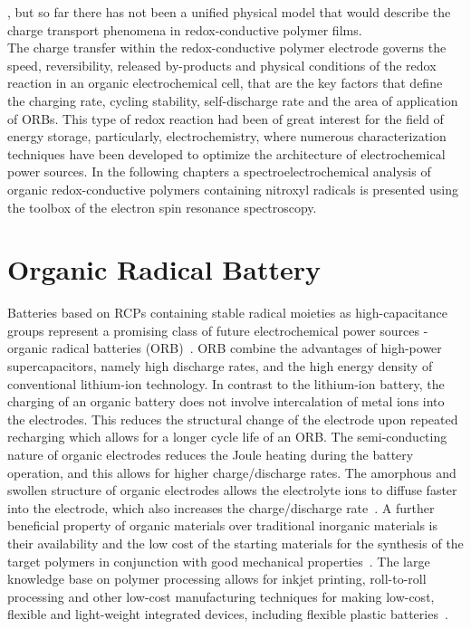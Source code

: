  , but so far there has not been a unified physical model that would describe the charge transport phenomena in redox-conductive polymer films.\\

The charge transfer within the redox-conductive polymer electrode governs the speed, reversibility, released by-products and physical conditions of the redox reaction in an organic electrochemical cell, that are the key factors that define the charging rate, cycling stability, self-discharge rate and the area of application of ORBs. This type of redox reaction had been of great interest for the field of energy storage, particularly, electrochemistry, where numerous characterization techniques have been developed to optimize the architecture of electrochemical power sources. In the following chapters a spectroelectrochemical analysis of organic redox-conductive polymers containing nitroxyl radicals is presented using the toolbox of the electron spin resonance spectroscopy.\\

\section{Organic Radical Battery}

Batteries based on RCPs containing stable radical moieties as high-capacitance groups represent a promising class of future electrochemical power sources - organic radical batteries (ORB)~\cite{nakahara2002_cpl, nishide2004_electact,xie2021_mathoriz,Rohland_2021}. ORB combine the advantages of high-power supercapacitors, namely high discharge rates, and the high energy density of conventional lithium-ion technology. In contrast to the lithium-ion battery, the charging of an organic battery does not involve intercalation of metal ions into the electrodes. This reduces the structural change of the electrode upon repeated recharging which allows for a longer cycle life of an ORB. The semi-conducting nature of organic electrodes reduces the Joule heating during the battery operation, and this allows for higher charge/discharge rates. The amorphous and swollen structure of organic electrodes allows the electrolyte ions to diffuse faster into the electrode, which also increases the charge/discharge rate~\cite{nishide_2009}. A further beneficial property of organic materials over traditional inorganic materials is their availability and the low cost of the starting materials for the synthesis of the target polymers in conjunction with good mechanical properties~\cite{janoschka2012_advmater, muench2016_chemrev, friebe2017_topcurrchem}. The large knowledge base on polymer processing allows for inkjet printing, roll-to-roll processing and other low-cost manufacturing techniques for making low-cost, flexible and light-weight integrated devices, including flexible plastic batteries~\cite{janoschka2012_advmater,nishide_2009}. 

